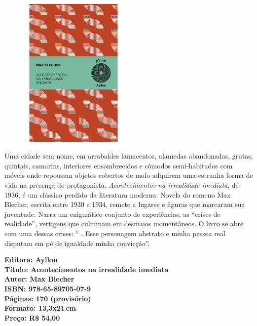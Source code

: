 \pagebreak

\begin{center}
\hspace*{.5cm}\includegraphics[width=74mm]{./CAPAS/blecher.jpg}
\end{center}

\hspace*{-7cm}\hrulefill\hspace*{-7cm}

\medskip

\noindent{}Uma cidade sem nome, em arrabaldes lamacentos, alamedas abandonadas, grutas, quintais, camarins, interiores ensombrecidos e cômodos semi-habitados com móveis onde repousam objetos cobertos de mofo adquirem uma estranha forma de vida na presença do protagonista.
\textit{Acontecimentos na irrealidade imediata}, de 1936, é um clássico perdido da literatura moderna. Novela do romeno Max Blecher, escrita entre 1930 e 1934, remete a lugares e figuras que marcaram sua juventude. Narra um enigmático conjunto de experiências, as ``crises de realidade'', vertigens que culminam em desmaios momentâneos. O livro se abre com uma dessas crises: `` . Esse personagem abstrato e minha pessoa real disputam em pé de igualdade minha convicção''.
\vfill

\noindent\begin{minipage}[c]{1\linewidth}
{\small\textbf{
\hspace*{-.1cm}Editora: Ayllon\\
Título: Acontecimentos na irrealidade imediata\\
Autor: Max Blecher\\ 
ISBN: 978-65-89705-07-9\\
Páginas: 170 (provisório)\\
Formato: 13,3x21\,cm\\
Preço: R\$ 54,00\\
}}
\end{minipage}

